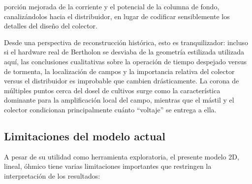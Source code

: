 \documentclass[
]{article}
\begin{document}
porción mejorada de la corriente y el potencial de la columna de fondo,
canalizándolos hacia el distribuidor, en lugar de codificar
sensiblemente los detalles del diseño del colector.

Desde una perspectiva de reconstrucción histórica, esto es
tranquilizador: incluso si el hardware real de Bertholon se desviaba de
la geometría estilizada utilizada aquí, las conclusiones cualitativas
sobre la operación de tiempo despejado versus de tormenta, la
localización de campos y la importancia relativa del colector versus el
distribuidor es improbable que cambien drásticamente. La corona de
múltiples puntos cerca del dosel de cultivos surge como la
característica dominante para la amplificación local del campo, mientras
que el mástil y el colector condicionan principalmente cuánto
``voltaje'' se entrega a ella.

\subsection{Limitaciones del modelo
actual}\label{limitaciones-del-modelo-actual}

A pesar de su utilidad como herramienta exploratoria, el presente modelo
2D, lineal, óhmico tiene varias limitaciones importantes que restringen
la interpretación de los resultados:
\end{document}
